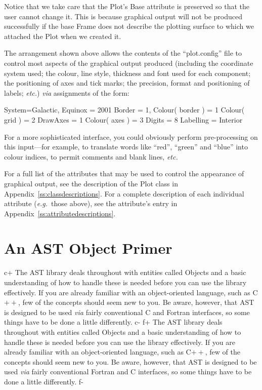 \documentclass[twoside,11pt]{starlink}
\providecommand{\appref}[1]{Appendix~\ref{#1}}
\begin{document}
Notice that we take care that the Plot's Base attribute is preserved
so that the user cannot change it. This is because graphical output
will not be produced successfully if the base Frame does not describe
the plotting surface to which we attached the Plot when we created it.

The arrangement shown above allows the contents of the ``plot.config''
file to control most aspects of the graphical output produced
(including the coordinate system used; the colour, line style,
thickness and font used for each component; the positioning of axes
and tick marks; the precision, format and positioning of labels;
\emph{etc.}) \emph{via} assignments of the form:

\small
\begin{terminalv}
System=Galactic, Equinox = 2001
Border = 1, Colour( border ) = 1
Colour( grid ) = 2
DrawAxes = 1
Colour( axes ) = 3
Digits = 8
Labelling = Interior
\end{terminalv}
\normalsize

For a more sophisticated interface, you could obviously perform
pre-processing on this input---for example, to translate words like
``red'', ``green'' and ``blue'' into colour indices, to permit
comments and blank lines, \emph{etc.}

For a full list of the attributes that may be used to control the
appearance of graphical output, see the description of the Plot class
in \appref{ss:classdescriptions}. For a complete description of each
individual attribute (\emph{e.g.}\ those above), see the attribute's
entry in \appref{ss:attributedescriptions}.

\cleardoublepage
\section{\label{ss:primer}An AST Object Primer}

c+
The AST library deals throughout with entities called Objects and a
basic understanding of how to handle these is needed before you can
use the library effectively.  If you are already familiar with an
object-oriented language, such as C$++$, few of the concepts should
seem new to you.  Be aware, however, that AST is designed to be used
\emph{via} fairly conventional C and Fortran interfaces, so some
things have to be done a little differently.
c-
f+
The AST library deals throughout with entities called Objects and a
basic understanding of how to handle these is needed before you can
use the library effectively.  If you are already familiar with an
object-oriented language, such as C$++$, few of the concepts should
seem new to you.  Be aware, however, that AST is designed to be used
\emph{via} fairly conventional Fortran and C interfaces, so some
things have to be done a little differently.
f-
\end{document}
